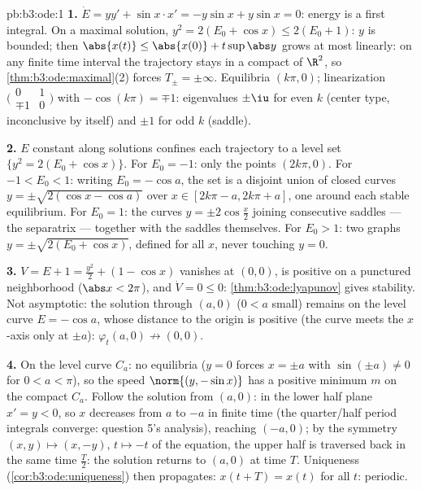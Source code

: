 \begin{solution}{pb:b3:ode:1}
\textbf{1.} $\dot E = yy' + \sin x\cdot x' = -y\sin x +
y\sin x = 0$: energy is a first integral. On a maximal
solution, $y^2 = 2(E_0 + \cos x) \leq 2(E_0 + 1)$: $y$ is
bounded; then $\abs{x(t)} \leq \abs{x(0)} +
t\sup\abs y$ grows at most linearly: on any finite time
interval the trajectory stays in a compact of $\R^2$, so
\cref{thm:b3:ode:maximal}(2) forces $T_\pm = \pm\infty$.
Equilibria $(k\pi, 0)$; linearization
$\bigl(\begin{smallmatrix}0&1\\
\mp1&0\end{smallmatrix}\bigr)$ with $-\cos(k\pi) = \mp1$:
eigenvalues $\pm\iu$ for even $k$ (center type, inconclusive
by itself) and $\pm1$ for odd $k$ (saddle).

\textbf{2.} $E$ constant along solutions confines each
trajectory to a level set $\{y^2 = 2(E_0 + \cos x)\}$. For
$E_0 = -1$: only the points $(2k\pi, 0)$. For $-1 < E_0 <
1$: writing $E_0 = -\cos a$, the set is a disjoint union of
closed curves $y = \pm\sqrt{2(\cos x - \cos a)}$ over $x \in
[2k\pi - a, 2k\pi + a]$, one around each stable equilibrium.
For $E_0 = 1$: the curves $y = \pm2\cos\frac x2$ joining
consecutive saddles --- the separatrix --- together with the
saddles themselves. For $E_0 > 1$: two graphs $y =
\pm\sqrt{2(E_0 + \cos x)}$, defined for all $x$, never
touching $y = 0$.

\textbf{3.} $V = E + 1 = \frac{y^2}2 + (1 - \cos x)$
vanishes at $(0,0)$, is positive on a punctured neighborhood
($\abs x < 2\pi$), and $\dot V = 0 \leq 0$:
\cref{thm:b3:ode:lyapunov} gives stability. Not asymptotic:
the solution through $(a, 0)$ ($0 < a$ small) remains on the
level curve $E = -\cos a$, whose distance to the origin is
positive (the curve meets the $x$-axis only at $\pm a$):
$\varphi_t(a, 0) \not\to (0,0)$.

\textbf{4.} On the level curve $C_a$: no equilibria ($y = 0$
forces $x = \pm a$ with $\sin(\pm a) \neq 0$ for $0 < a <
\pi$), so the speed $\norm{(y, -\sin x)}$ has a positive
minimum $m$ on the compact $C_a$. Follow the solution from
$(a, 0)$: in the lower half plane $x' = y < 0$, so $x$
decreases from $a$ to $-a$ in finite time (the quarter/half
period integrals converge: question 5's analysis), reaching
$(-a, 0)$; by the symmetry $(x, y) \mapsto (x, -y)$, $t
\mapsto -t$ of the equation, the upper half is traversed
back in the same time $\frac T2$: the solution returns to
$(a, 0)$ at time $T$. Uniqueness
(\cref{cor:b3:ode:uniqueness}) then propagates: $x(t + T) =
x(t)$ for all $t$: periodic.


\end{solution}
